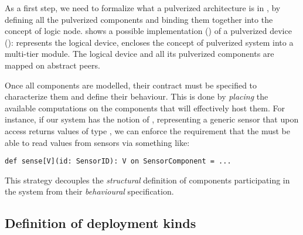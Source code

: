 

As a first step, we need to formalize what a pulverized architecture is in \scalaloci{},
by defining all the pulverized components and binding them together into the concept of logic node.
%
 shows a possible \scalaloci{} implementation () of a pulverized device ():
 represents the logical device,
 encloses the concept of pulverized system into a multi-tier module.
%
The logical device and all its pulverized components are mapped on abstract peers.
%

Once all components are modelled,
their contract must be specified to characterize them and define their behaviour.
%
This is done by \emph{placing} the available computations on the components that will effectively host them.
%
For instance, if our system has the notion of ,
representing a generic sensor that upon access returns values of type ,
we can enforce the requirement that the  must be able to read values from sensors via something like: 
\begin{verbatim}
def sense[V](id: SensorID): V on SensorComponent = ...
\end{verbatim}
%
This strategy decouples the \emph{structural} definition of components participating in the system from their \emph{behavioural} specification.

\subsection{Definition of deployment kinds}



